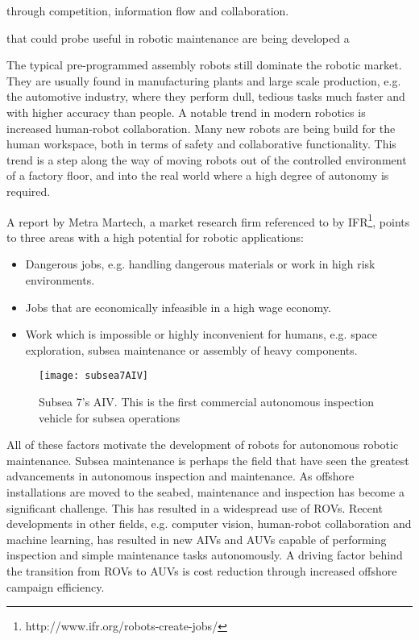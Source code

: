  through competition, information flow and collaboration.

 that could probe useful in robotic maintenance are being developed a
 
The typical pre-programmed assembly robots still dominate the robotic market. They are usually found in manufacturing plants and large scale production\cite{ifr_statistics}, e.g. the automotive industry, where they perform dull, tedious tasks much faster and with higher accuracy than people. A notable trend in modern robotics is increased human-robot collaboration\cite{cobotsEurope}. Many new robots are being build for the human workspace, both in terms of safety and collaborative functionality. This trend is a step along the way of moving robots out of the controlled environment of a factory floor, and into the real world where a high degree of autonomy is required.

A report by Metra Martech\cite{metraMartechGorle}, a market research firm referenced to by \ac{IFR}\footnote{http://www.ifr.org/robots-create-jobs/}, points to three areas with a high potential for robotic applications:

\begin{itemize}
	\item Dangerous jobs, e.g. handling dangerous materials or work in high risk environments.
	\item Jobs that are economically infeasible in a high wage economy.
	\item Work which is impossible or highly inconvenient for humans, e.g. space exploration, subsea maintenance or assembly of heavy components.
\end{itemize}

\begin{wrapfigure}{r}{0.5\textwidth}
	\begin{center}
		\texttt{[image: subsea7AIV]}
	\end{center}
	\caption{Subsea 7's AIV. This is the first commercial autonomous inspection vehicle for subsea operations \cite{pressAIV}}
\end{wrapfigure}

All of these factors motivate the development of robots for autonomous robotic maintenance.
Subsea maintenance is perhaps the field that have seen the greatest advancements in autonomous inspection and maintenance. As offshore installations are moved to the seabed, maintenance and inspection has become a significant challenge. This has resulted in a widespread use of \acp{ROV}. Recent developments in other fields, e.g. computer vision, human-robot collaboration and machine learning, has resulted in new \acp{AIV} and \acp{AUV} capable of performing inspection and simple maintenance tasks autonomously\cite{subseaAIV}\cite{Ridao2015227}. A driving factor behind the transition from \acp{ROV} to \acp{AUV} is cost reduction through increased offshore campaign efficiency.




